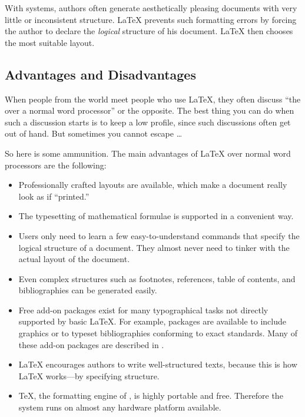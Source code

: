With  systems, authors often generate aesthetically
pleasing documents with very little or inconsistent structure.
\LaTeX{} prevents such formatting errors by forcing the author to
declare the \emph{logical} structure of his document. \LaTeX{} then
chooses the most suitable layout.

\subsection{Advantages and Disadvantages}

When people from the  world meet people who use \LaTeX{},
they often discuss ``the  over a normal
word processor'' or the opposite.  The best thing you can do when such
a discussion starts is to keep a low profile, since such discussions
often get out of hand. But sometimes you cannot escape \ldots

\medskip\noindent So here is some ammunition. The main advantages
of \LaTeX{} over normal word processors are the following:

\begin{itemize}

\item Professionally crafted layouts are available, which make a
  document really look as if ``printed.''
\item The typesetting of mathematical formulae is supported in a
  convenient way.
\item Users only need to learn a few easy-to-understand commands
  that specify the logical structure of a document. They almost never
  need to tinker with the actual layout of the document.
\item Even complex structures such as footnotes, references, table of
  contents, and bibliographies can be generated easily.
\item Free add-on packages exist for many typographical tasks not directly supported by basic
  \LaTeX. For example, packages are
  available to include \PSi{} graphics or to typeset
  bibliographies conforming to exact standards. Many of these add-on
  packages are described in \companion.
\item \LaTeX{} encourages authors to write well-structured texts,
  because this is how \LaTeX{} works---by specifying structure.
\item \TeX, the formatting engine of \LaTeXe, is highly portable and free.
  Therefore the system runs on almost any hardware platform
  available. 

%
%
\end{itemize}

